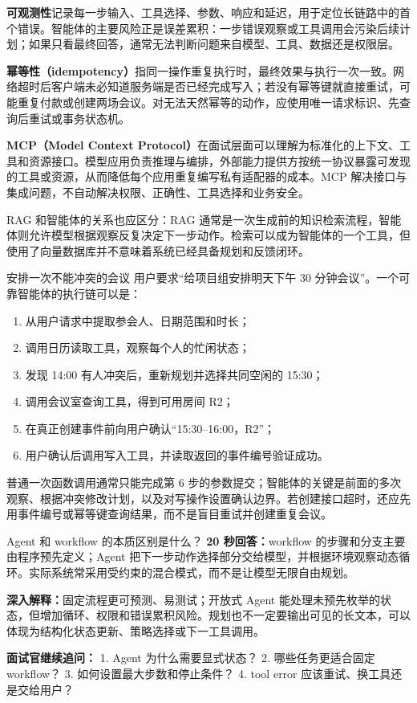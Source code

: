 \textbf{可观测性}记录每一步输入、工具选择、参数、响应和延迟，用于定位长链路中的首个错误。智能体的主要风险正是误差累积：一步错误观察或工具调用会污染后续计划；如果只看最终回答，通常无法判断问题来自模型、工具、数据还是权限层。

\textbf{幂等性（idempotency）}指同一操作重复执行时，最终效果与执行一次一致。网络超时后客户端未必知道服务端是否已经完成写入；若没有幂等键就直接重试，可能重复付款或创建两场会议。对无法天然幂等的动作，应使用唯一请求标识、先查询后重试或事务状态机。

\textbf{MCP（Model Context Protocol）}在面试层面可以理解为标准化的上下文、工具和资源接口。模型应用负责推理与编排，外部能力提供方按统一协议暴露可发现的工具或资源，从而降低每个应用重复编写私有适配器的成本。MCP 解决接口与集成问题，不自动解决权限、正确性、工具选择和业务安全。

RAG 和智能体的关系也应区分：RAG 通常是一次生成前的知识检索流程，智能体则允许模型根据观察反复决定下一步动作。检索可以成为智能体的一个工具，但使用了向量数据库并不意味着系统已经具备规划和反馈闭环。

\begin{examplebox}{安排一次不能冲突的会议}
用户要求“给项目组安排明天下午 30 分钟会议”。一个可靠智能体的执行链可以是：
\begin{enumerate}
  \item 从用户请求中提取参会人、日期范围和时长；
  \item 调用日历读取工具，观察每个人的忙闲状态；
  \item 发现 14:00 有人冲突后，重新规划并选择共同空闲的 15:30；
  \item 调用会议室查询工具，得到可用房间 R2；
  \item 在真正创建事件前向用户确认“15:30--16:00，R2”；
  \item 用户确认后调用写入工具，并读取返回的事件编号验证成功。
\end{enumerate}
普通一次函数调用通常只能完成第 6 步的参数提交；智能体的关键是前面的多次观察、根据冲突修改计划，以及对写操作设置确认边界。若创建接口超时，还应先用事件编号或幂等键查询结果，而不是盲目重试并创建重复会议。
\end{examplebox}

\begin{interviewbox}{Agent 和 workflow 的本质区别是什么？}
\textbf{20 秒回答：}workflow 的步骤和分支主要由程序预先定义；Agent 把下一步动作选择部分交给模型，并根据环境观察动态循环。实际系统常采用受约束的混合模式，而不是让模型无限自由规划。

\textbf{深入解释：}固定流程更可预测、易测试；开放式 Agent 能处理未预先枚举的状态，但增加循环、权限和错误累积风险。规划也不一定要输出可见的长文本，可以体现为结构化状态更新、策略选择或下一工具调用。

\textbf{面试官继续追问：}
1. Agent 为什么需要显式状态？
2. 哪些任务更适合固定 workflow？
3. 如何设置最大步数和停止条件？
4. tool error 应该重试、换工具还是交给用户？
\end{interviewbox}

